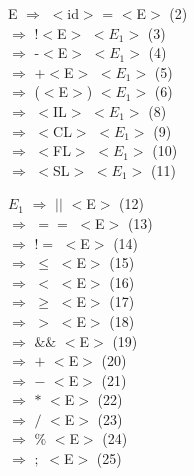 \documentclass[]{article}
\numberwithin{equation}{section}
\begin{document}
\begin{flushleft}
E $\Rightarrow$ $<$id$>$ = $<$E$>$ (2) \\
\hspace{0.22cm} $\Rightarrow$ !$<$E$>$ $<$$E_1$$>$ (3)\\
\hspace{0.22cm} $\Rightarrow$ -$<$E$>$ $<$$E_1$$>$ (4)\\
\hspace{0.22cm} $\Rightarrow$ +$<$E$>$ $<$$E_1$$>$ (5)\\
\hspace{0.22cm} $\Rightarrow$ ($<$E$>$) $<$$E_1$$>$ (6)\\
\hspace{0.22cm} $\Rightarrow$ $<$IL$>$ $<$$E_1$$>$ (8)\\
\hspace{0.22cm} $\Rightarrow$ $<$CL$>$ $<$$E_1$$>$ (9)\\
\hspace{0.22cm} $\Rightarrow$ $<$FL$>$ $<$$E_1$$>$ (10)\\
\hspace{0.22cm} $\Rightarrow$ $<$SL$>$ $<$$E_1$$>$ (11)
\end{flushleft}

\begin{flushleft}
$E_1$ $\Rightarrow$ $||$ $<$E$>$ (12) \\
\hspace{0.36cm} $\Rightarrow$ $==$ $<$E$>$ (13)\\ 
\hspace{0.36cm} $\Rightarrow$ $!=$ $<$E$>$ (14)\\ 
\hspace{0.36cm} $\Rightarrow$ $\leq$ $<$E$>$ (15)\\ 
\hspace{0.36cm} $\Rightarrow$ $<$ $<$E$>$ (16)\\ 
\hspace{0.36cm} $\Rightarrow$ $\geq$ $<$E$>$ (17)\\ 
\hspace{0.36cm} $\Rightarrow$ $>$ $<$E$>$ (18)\\ 
\hspace{0.36cm} $\Rightarrow$ $\&\&$ $<$E$>$ (19)\\ 
\hspace{0.36cm} $\Rightarrow$ $+$ $<$E$>$ (20)\\ 
\hspace{0.36cm} $\Rightarrow$ $-$ $<$E$>$ (21)\\ 
\hspace{0.36cm} $\Rightarrow$ $*$ $<$E$>$ (22)\\ 
\hspace{0.36cm} $\Rightarrow$ $/$ $<$E$>$ (23)\\ 
\hspace{0.36cm} $\Rightarrow$ $\%$ $<$E$>$ (24)\\
\hspace{0.36cm} $\Rightarrow$ $;$ $<$E$>$ (25)
\end{flushleft}
\end{document}
